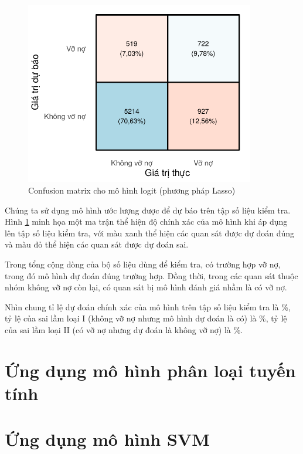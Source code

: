 \documentclass[a4paper]{report}\usepackage[]{graphicx}\usepackage[]{color}
\newenvironment{knitrout}{}{} %
\begin{document}
\begin{figure}
\centering
\capstart
\begin{knitrout}\small
{}\color{fgcolor}
\includegraphics[width=10cm]{Figures/lasso_confusion_mat-1} 

\end{knitrout}
\caption{Confusion matrix cho mô hình logit (phương pháp Lasso)}
\label{fig:lasso_confusion_mat}
\end{figure}

Chúng ta sử dụng mô hình ước lượng được để dự báo trên tập số liệu kiểm tra. Hình \ref{fig:lasso_confusion_mat} minh họa một ma trận thể hiện độ chính xác của mô hình khi áp dụng lên tập số liệu kiểm tra, với màu xanh thể hiện các quan sát được dự đoán đúng và màu đỏ thể hiện các quan sát được dự đoán sai.

Trong tổng cộng  dòng của bộ số liệu dùng để kiểm tra, có  trường hợp vỡ nợ, trong đó mô hình dự đoán đúng  trường hợp. 
Đồng thời, trong các quan sát thuộc nhóm không vỡ nợ còn lại, có  quan sát bị mô hình đánh giá nhầm là có vỡ nợ.

Nhìn chung tỉ lệ dự đoán chính xác của mô hình trên tập số liệu kiểm tra là \%, tỷ lệ của sai lầm loại I (không vỡ nợ nhưng mô hình dự đoán là có) là \%, tỷ lệ của sai lầm loại II (có vỡ nợ nhưng dự đoán là không vỡ nợ) là \%.


\section{Ứng dụng mô hình phân loại tuyến tính}

\section{Ứng dụng mô hình SVM}
\end{document}
